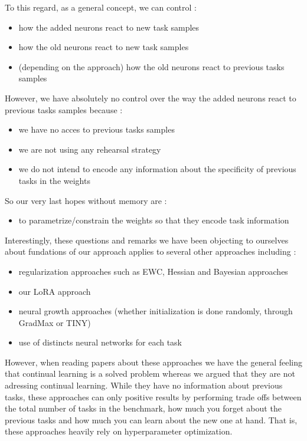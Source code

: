 \documentclass{article}
\begin{document}
To this regard, as a general concept, we can control :
\begin{itemize}
    \item how the added neurons react to new task samples
    \item how the old neurons react to new task samples
    \item (depending on the approach) how the old neurons react to previous tasks samples
\end{itemize}

However, we have absolutely no control over the way the added neurons react to previous tasks samples because :
\begin{itemize}
    \item we have no acces to previous tasks samples
    \item we are not using any rehearsal strategy
    \item we do not intend to encode any information about the specificity of previous tasks in the weights 
\end{itemize}

So our very last hopes without memory are :
\begin{itemize}
    \item to parametrize/constrain the weights so that they encode task information
\end{itemize}

Interestingly, these questions and remarks we have been objecting to ourselves about fundations of our approach applies to several other approaches including :
\begin{itemize}
    \item regularization approaches such as EWC, Hessian and Bayesian approaches
    \item our LoRA approach
    \item neural growth approaches (whether initialization is done randomly, through GradMax or TINY)
    \item use of distincts neural networks for each task
\end{itemize}

However, when reading papers about these approaches we have the general feeling that continual learning is a solved problem whereas we argued that they are not adressing continual learning. While they have no information about previous tasks, these approaches can only positive results by performing trade offs between the total number of tasks in the benchmark, how much you forget about the previous tasks and how much you can learn about the new one at hand. That is, these approaches heavily rely on hyperparameter optimization.
\end{document}
